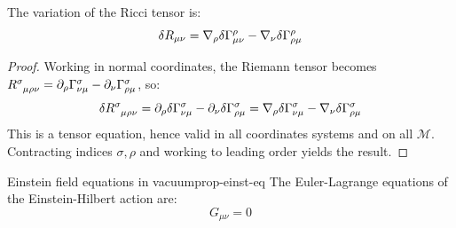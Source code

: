\begin{lemma}{}{}
  The variation of the Ricci tensor is:
  \begin{equation}
    \delta R_{\mu \nu} = \nabla_\rho \delta \Gamma^\rho_{\mu \nu} - \nabla_\nu \delta \Gamma^\rho_{\rho \mu}
  \end{equation}
\end{lemma}

\begin{proofbox}
  \begin{proof}
    Working in normal coordinates, the Riemann tensor becomes $ \tensor{R}{^\sigma_{\mu \rho \nu}} = \pa_\rho \Gamma^\sigma_{\nu \mu} - \pa_\nu \Gamma^\sigma_{\rho \mu} $, so:
    \begin{equation*}
      \delta \tensor{R}{^\sigma_{\mu \rho \nu}} = \pa_\rho \delta \Gamma^\sigma_{\nu \mu} - \pa_\nu \delta \Gamma^\sigma_{\rho \mu} = \na_\rho \delta \Gamma^\sigma_{\nu \mu} - \na_\nu \delta \Gamma^\sigma_{\rho \mu}
    \end{equation*}
    This is a tensor equation, hence valid in all coordinates systems and on all $ \mathcal{M} $. Contracting indices $ \sigma,\rho $ and working to leading order yields the result.
  \end{proof}
\end{proofbox}

\begin{proposition}{Einstein field equations in vacuum}{prop-einst-eq}
  The Euler-Lagrange equations of the Einstein-Hilbert action are:
  \begin{equation}
    G_{\mu \nu} = 0
    \label{eq:vacuum-feq}
  \end{equation}
\end{proposition}


